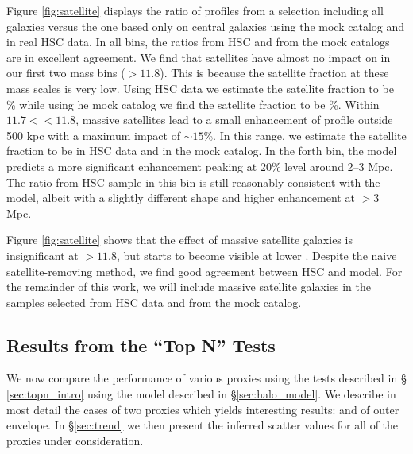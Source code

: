 \documentclass[fleqn,usenatbib,useAMS,english]{mnras}
\begin{document}
    Figure \ref{fig:satellite} displays the ratio of \dsigma{} profiles from a selection
    including all galaxies versus the one based only on central galaxies using the mock catalog
    and in real HSC data. In all \mmax{} bins, the ratios from HSC and from the mock catalogs are
    in excellent agreement. We find that satellites have almost no impact on \dsigma{} in our
    first two mass bins (\logmmax{}$>11.8$). This is because the satellite fraction at these mass
    scales is very low. Using HSC data we estimate the satellite fraction to be \% while
    using he mock catalog we find the satellite fraction to be \%. Within $11.7
    <$\logmmax{}$<11.8$, massive satellites lead to a small enhancement of \dsigma{} profile
    outside 500 kpc with a maximum impact of $\sim 15$\%. In this \mmax{} range, we estimate the
    satellite fraction to be  in HSC data and  in the mock catalog. In the
    forth \mmax{} bin, the  model predicts a more significant enhancement peaking at 20\%
    level around 2--3 Mpc. The ratio from HSC sample in this bin is still reasonably consistent
    with the model, albeit with a slightly different shape and higher enhancement at $>3$ Mpc.

    Figure \ref{fig:satellite} shows that the effect of massive satellite galaxies is insignificant
    at \logmmax{}$>11.8$, but starts to become visible at lower \mmax{}.
    Despite the naive satellite-removing method, we find good agreement between HSC and
    model. For the remainder of this work, we will include massive satellite galaxies in the
    samples selected from HSC data and from the mock catalog.

\subsection{Results from the ``Top N'' Tests}
    \label{sec:topn_results}

    We now compare the performance of various proxies using the \topn{} tests described in \S
    \ref{sec:topn_intro} using the model described in \S \ref{sec:halo_model}. We describe in
    most detail the cases of two proxies which yields interesting results: \mcmodel{} and
    \mstar{} of outer envelope. In \S \ref{sec:trend} we then present the inferred scatter values
    for all of the proxies under consideration.
\end{document}
